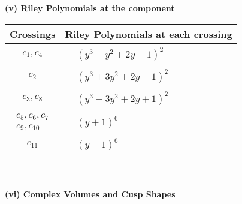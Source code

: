 \documentclass[1p]{elsarticle_modified}
\theoremstyle{definition}
\begin{document}
\newpage\renewcommand{\arraystretch}{1}
\flushleft \textbf{(v) Riley Polynomials at the component}\newline \\
\begin{tabular}{m{50pt}|m{274pt}}
Crossings & \hspace{64pt}Riley Polynomials at each crossing \\
\hline $$\begin{aligned}c_{1},c_{4}\end{aligned}$$&$\begin{aligned}
&(y^3- y^2+2 y-1)^2
\end{aligned}$\\
\hline $$\begin{aligned}c_{2}\end{aligned}$$&$\begin{aligned}
&(y^3+3 y^2+2 y-1)^2
\end{aligned}$\\
\hline $$\begin{aligned}c_{3},c_{8}\end{aligned}$$&$\begin{aligned}
&(y^3-3 y^2+2 y+1)^2
\end{aligned}$\\
\hline $$\begin{aligned}c_{5},c_{6},c_{7}\\c_{9},c_{10}\end{aligned}$$&$\begin{aligned}
&(y+1)^6
\end{aligned}$\\
\hline $$\begin{aligned}c_{11}\end{aligned}$$&$\begin{aligned}
&(y-1)^6
\end{aligned}$\\
\hline
\end{tabular}\\~\\
\newpage\flushleft \textbf{(vi) Complex Volumes and Cusp Shapes}
\end{document}
